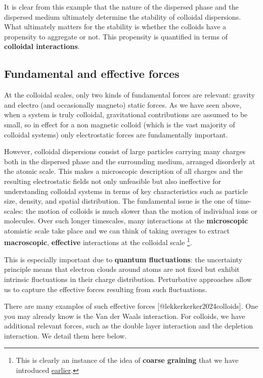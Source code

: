 \documentclass[
  letterpaper,
  enabledeprecatedfontcommands]{report}
\begin{document}
It is clear from this example that the nature of the dispersed phase and
the dispersed medium ultimately determine the stability of colloidal
dispersions. What ultimately matters for the stability is whether the
colloids have a propensity to aggregate or not. This propensity is
quantified in terms of \textbf{colloidal interactions}.

\subsection{Fundamental and effective
forces}\label{fundamental-and-effective-forces}

At the colloidal scales, only two kinds of fundamental forces are
relevant: gravity and electro (and occasionally magneto) static forces.
As we have seen above, when a system is truly colloidal, gravitational
contributions are assumed to be small, so in effect for a non magnetic
colloid (which is the vast majority of colloidal systems) only
electrostatic forces are fundamentally important.

However, colloidal dispersions consist of large particles carrying many
charges both in the dispersed phase and the surrounding medium, arranged
disorderly at the atomic scale. This makes a microscopic description of
all charges and the resulting electrostatic fields not only unfeasible
but also ineffective for understanding colloidal systems in terms of key
characteristics such as particle size, density, and spatial
distribution. The fundamental issue is the one of time-scales: the
motion of colloids is much slower than the motion of individual ions or
molecules. Over such longer timescales, many interactions at the
\textbf{microscopic} atomistic scale take place and we can think of
taking averages to extract \textbf{macroscopic}, \textbf{effective}
interactions at the colloidal scale \footnote{This is clearly an
  instance of the idea of \textbf{coarse graining} that we have
  introduced \hyperref[entropy-matters]{earlier}.}.

This is especially important due to \textbf{quantum fluctuations}: the
uncertainty principle means that electron clouds around atoms are not
fixed but exhibit intrinsic fluctuations in their charge distribution.
Perturbative approaches allow us to capture the effective forces
resulting from such fluctuations.

There are many examples of such effective forces
{[}@lekkerkerker2024colloids{]}. One you may already know is the Van der
Waals interaction. For colloids, we have additional relevant forces,
such as the double layer interaction and the depletion interaction. We
detail them here below.
\end{document}
